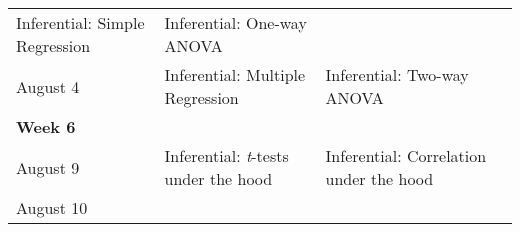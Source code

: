 \documentclass[
]{book}
\begin{document}
\begin{longtable}[]{@{}llll@{}}
\begin{minipage}[t]{0.32\columnwidth}
Inferential: Simple Regression\strut
\end{minipage} & \begin{minipage}[t]{0.29\columnwidth}\raggedright
Inferential: One-way ANOVA\strut
\end{minipage} & \begin{minipage}[t]{0.18\columnwidth}\raggedright
\strut
\end{minipage}\tabularnewline
\begin{minipage}[t]{0.09\columnwidth}\raggedright
August 4\strut
\end{minipage} & \begin{minipage}[t]{0.32\columnwidth}\raggedright
Inferential: Multiple Regression\strut
\end{minipage} & \begin{minipage}[t]{0.29\columnwidth}\raggedright
Inferential: Two-way ANOVA\strut
\end{minipage} & \begin{minipage}[t]{0.18\columnwidth}\raggedright
\strut
\end{minipage}\tabularnewline
\begin{minipage}[t]{0.09\columnwidth}\raggedright
\textbf{Week 6}\strut
\end{minipage} & \begin{minipage}[t]{0.32\columnwidth}\raggedright
\strut
\end{minipage} & \begin{minipage}[t]{0.29\columnwidth}\raggedright
\strut
\end{minipage} & \begin{minipage}[t]{0.18\columnwidth}\raggedright
\strut
\end{minipage}\tabularnewline
\begin{minipage}[t]{0.09\columnwidth}\raggedright
August 9\strut
\end{minipage} & \begin{minipage}[t]{0.32\columnwidth}\raggedright
Inferential: \emph{t}-tests under the hood\strut
\end{minipage} & \begin{minipage}[t]{0.29\columnwidth}\raggedright
Inferential: Correlation under the hood\strut
\end{minipage} & \begin{minipage}[t]{0.18\columnwidth}\raggedright
\strut
\end{minipage}\tabularnewline
\begin{minipage}[t]{0.09\columnwidth}\raggedright
August 10\strut

\end{minipage}
\end{longtable}
\end{document}
